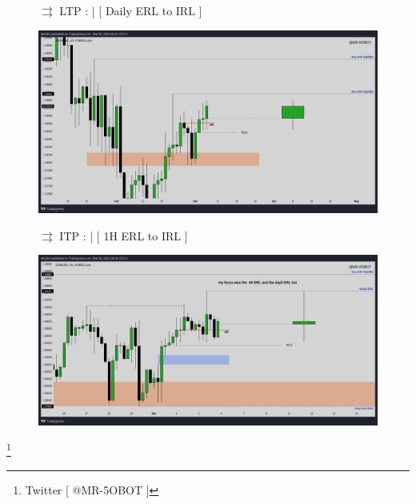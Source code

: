 \documentclass{article}
\begin{document}
\begin{figure}[h]
\begin{notebox}
\noindent \( \rightrightarrows \) \hspace{0.1cm}LTP : | [ Daily ERL to IRL ] 
  \begin{center}
    \includegraphics[scale=0.31]{./figures/EURUSD_2024-03-06_Daily.png}
  \end{center}
\end{notebox}

\begin{notebox}
   \( \rightrightarrows \) \hspace{0.1cm}ITP : | [ 1H ERL to IRL ]
  \begin{center}
    \includegraphics[scale=0.31]{./figures/EURUSD_2024-03-06_4H.png}
  \end{center}
\end{notebox}
\end{figure}

\footnote{Twitter [ @MR-5OBOT ]}
\newpage
\end{document}
